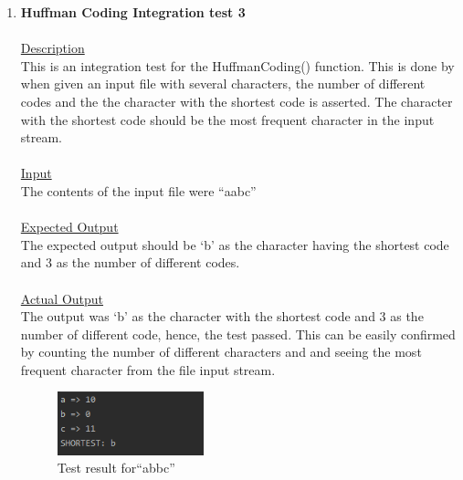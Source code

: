 \documentclass{article}
\newcommand{\quotes}[1]{``#1''}
\begin{document}
\begin{enumerate}
					
					\item \textbf{Huffman Coding Integration test 3}\\\\
		\underline{Description}\\
		\indent This is an integration test for the HuffmanCoding() function. This is done by when given an input file with several characters, the number of different codes and the the character with the shortest code is asserted. The character with the shortest code should be the most frequent character in the input stream.\\\\
		\underline{Input}\\
		\indent The contents of the input file were \quotes{aabc}\\	\\
		\underline{Expected Output}\\
		\indent The expected output should be `b' as the character having the shortest code and 3 as the number of different codes.\\\\
		\underline{Actual Output}\\
		The output was `b' as the character with the shortest code and 3 as the number of different code, hence, the test passed. This can be easily confirmed by counting the number of different characters and and seeing the most frequent character from the file input stream.
				\begin{figure}[H]
					\centering
			 			\includegraphics[width=0.4\textwidth]{hctest4.png}
			 			\centering
			  			\caption{Test result for\quotes{abbc}}
			  			\label{fig:hctest4}
					\end{figure}
					

\end{enumerate}
\end{document}
